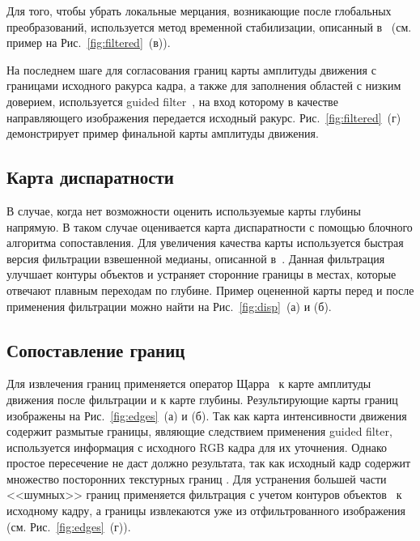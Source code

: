 \documentclass[14pt, a4paper]{extarticle}
\begin{document}
Для того, чтобы убрать локальные мерцания, возникающие после глобальных преобразований,
используется метод временной стабилизации, описанный в~\cite{matyunin2011temporal} 
(см. пример на Рис.~\ref{fig:filtered}~(в)).

На последнем шаге для согласования границ карты амплитуды движения с границами 
исходного ракурса кадра, а также для заполнения областей с низким доверием,
используется guided filter~\cite{he2013guided}, на вход которому в качестве
направляющего изображения передается исходный ракурс. Рис.~\ref{fig:filtered}~(г)
демонстрирует пример финальной карты амплитуды движения.

\subsection{Карта диспаратности}



В случае, когда нет возможности оценить используемые карты глубины напрямую. В таком
случае оценивается карта диспаратности с помощью блочного алгоритма сопоставления. 
Для увеличения качества карты используется быстрая версия фильтрации взвешенной медианы,
описанной в~\cite{zhang2014100+}. Данная фильтрация улучшает контуры объектов и
устраняет сторонние границы в местах, которые отвечают плавным переходам по глубине.
Пример оцененной карты перед и после применения фильтрации можно найти на Рис.~\ref{fig:disp}~(а) и (б).

\subsection{Сопоставление границ}



Для извлечения границ применяется оператор Щарра~\cite{jahne1999principles} к карте
амплитуды движения после фильтрации и к карте глубины. Результирующие карты границ
изображены на Рис.~\ref{fig:edges}~(а) и (б). Так как карта интенсивности движения
содержит размытые границы, являющие следствием применения guided filter, используется
информация с исходного RGB кадра для их уточнения. Однако простое пересечение не даст
должно результата, так как исходный кадр содержит множество посторонних текстурных
границ . Для устранения большей части <<шумных>> границ применяется фильтрация
с учетом контуров объектов~\cite{zhang2014rolling} к исходному кадру, а границы извлекаются
уже из отфильтрованного изображения (см. Рис.~\ref{fig:edges}~(г)).
\end{document}
